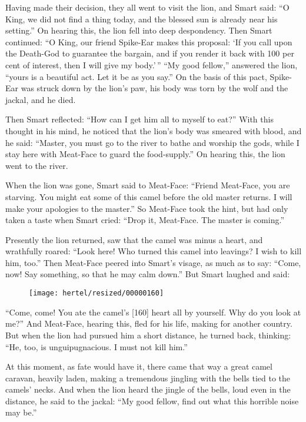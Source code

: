 \documentclass[article, twoside, 10pt]{memoir}
\begin{document}
Having made their decision, they all went to visit the lion, and
Smart said:
``O King, we did not find a thing today, and the blessed sun is already near his setting.''
On hearing this, the lion fell into deep despondency. Then Smart
continued:
``O King, our friend Spike-Ear makes this proposal: `If you call upon the Death-God to guarantee the bargain, and if you render it back with 100 per cent of interest, then I will give my body.'\,''
``My good fellow,'' answered the lion,
``yours is a beautiful act. Let it be as you say.'' On the basis of
this pact, Spike-Ear was struck down by the lion's paw, his body
was torn by the wolf and the jackal, and he died.

Then Smart reflected: ``How can I get him all to myself to eat?''
With this thought in his mind, he noticed that the lion's body was
smeared with blood, and he said:
``Master, you must go to the river to bathe and worship the gods, while I stay here with Meat-Face to guard the food-supply.''
On hearing this, the lion went to the river.

When the lion was gone, Smart said to Meat-Face:
``Friend Meat-Face, you are starving. You might eat some of this camel before the old master returns. I will make your apologies to the master.''
So Meat-Face took the hint, but had only taken a taste when Smart
cried: ``Drop it, Meat-Face. The master is coming.''

Presently the lion returned, saw that the camel was minus a heart,
and wrathfully roared:
``Look here! Who turned this camel into leavings? I wish to kill him, too.''
Then Meat-Face peered into Smart's visage, as much as to say:
``Come, now! Say something, so that he may calm down.'' But Smart
laughed and said:
\begin{figure}[p]\texttt{[image: hertel/resized/00000160]}\end{figure}``Come, come! You ate the camel's [160] heart all by yourself. Why do you look at me?''
And Meat-Face, hearing this, fled for his life, making for another
country. But when the lion had pursued him a short distance, he
turned back, thinking:
``He, too, is unguipugnacious. I must not kill him.''

At this moment, as fate would have it, there came that way a great
camel caravan, heavily laden, making a tremendous jingling with the
bells tied to the camels' necks. And when the lion heard the jingle
of the bells, loud even in the distance, he said to the jackal:
``My good fellow, find out what this horrible noise may be.''
\end{document}
